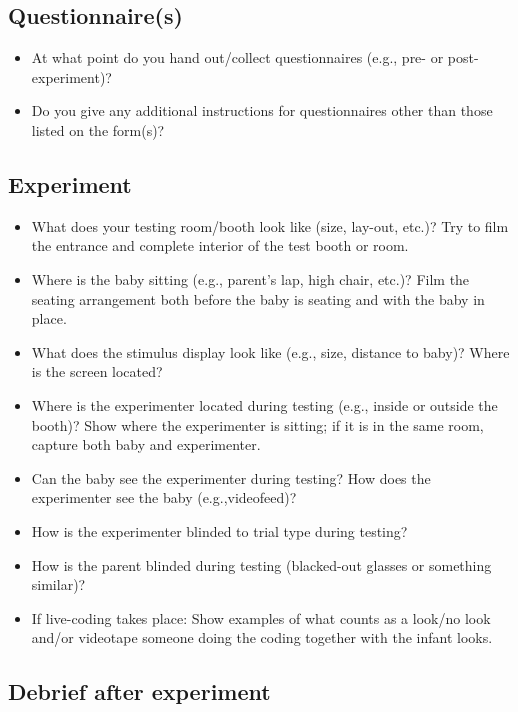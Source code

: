 \documentclass[
  letterpaper,
  DIV=11,
  numbers=noendperiod,
  oneside]{scrreprt}
\providecommand{\tightlist}{%
  \setlength{\itemsep}{0pt}\setlength{\parskip}{0pt}}
\begin{document}
\subsection{Questionnaire(s)}\label{questionnaires}

\begin{itemize}
\tightlist
\item
  At what point do you hand out/collect questionnaires (e.g., pre- or
  post-experiment)?
\item
  Do you give any additional instructions for questionnaires other than
  those listed on the form(s)?
\end{itemize}

\subsection{Experiment}\label{experiment}

\begin{itemize}
\tightlist
\item
  What does your testing room/booth look like (size, lay-out, etc.)? Try
  to film the entrance and complete interior of the test booth or room.
\item
  Where is the baby sitting (e.g., parent's lap, high chair, etc.)? Film
  the seating arrangement both before the baby is seating and with the
  baby in place.
\item
  What does the stimulus display look like (e.g., size, distance to
  baby)? Where is the screen located?
\item
  Where is the experimenter located during testing (e.g., inside or
  outside the booth)? Show where the experimenter is sitting; if it is
  in the same room, capture both baby and experimenter.
\item
  Can the baby see the experimenter during testing? How does the
  experimenter see the baby (e.g.,videofeed)?
\item
  How is the experimenter blinded to trial type during testing?
\item
  How is the parent blinded during testing (blacked-out glasses or
  something similar)?
\item
  If live-coding takes place: Show examples of what counts as a look/no
  look and/or videotape someone doing the coding together with the
  infant looks.
\end{itemize}

\subsection{Debrief after experiment}\label{debrief-after-experiment}
\end{document}
